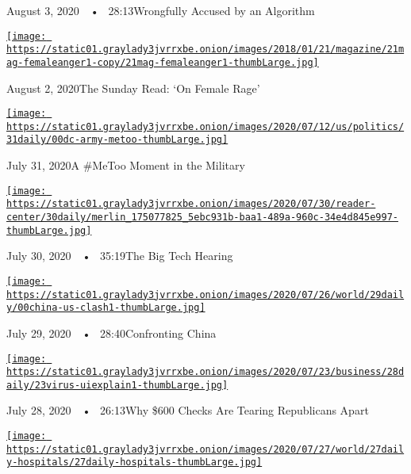 August 3, 2020~~•~ 28:13Wrongfully Accused by an Algorithm

\href{https://www.nytimes3xbfgragh.onion/2020/08/02/podcasts/the-daily/on-female-rage.html?action=click\&module=audio-series-bar\&region=header\&pgtype=Article}{\texttt{[image: https://static01.graylady3jvrrxbe.onion/images/2018/01/21/magazine/21mag-femaleanger1-copy/21mag-femaleanger1-thumbLarge.jpg]}}

August 2, 2020The Sunday Read: `On Female Rage'

\href{https://www.nytimes3xbfgragh.onion/2020/07/31/podcasts/the-daily/vanessa-guillen-military-metoo.html?action=click\&module=audio-series-bar\&region=header\&pgtype=Article}{\texttt{[image: https://static01.graylady3jvrrxbe.onion/images/2020/07/12/us/politics/31daily/00dc-army-metoo-thumbLarge.jpg]}}

July 31, 2020A \#MeToo Moment in the Military

\href{https://www.nytimes3xbfgragh.onion/2020/07/30/podcasts/the-daily/congress-facebook-amazon-google-apple.html?action=click\&module=audio-series-bar\&region=header\&pgtype=Article}{\texttt{[image: https://static01.graylady3jvrrxbe.onion/images/2020/07/30/reader-center/30daily/merlin\_175077825\_5ebc931b-baa1-489a-960c-34e4d845e997-thumbLarge.jpg]}}

July 30, 2020~~•~ 35:19The Big Tech Hearing

\href{https://www.nytimes3xbfgragh.onion/2020/07/29/podcasts/the-daily/china-trump-foreign-policy.html?action=click\&module=audio-series-bar\&region=header\&pgtype=Article}{\texttt{[image: https://static01.graylady3jvrrxbe.onion/images/2020/07/26/world/29daily/00china-us-clash1-thumbLarge.jpg]}}

July 29, 2020~~•~ 28:40Confronting China

\href{https://www.nytimes3xbfgragh.onion/2020/07/28/podcasts/the-daily/unemployment-benefits-coronavirus.html?action=click\&module=audio-series-bar\&region=header\&pgtype=Article}{\texttt{[image: https://static01.graylady3jvrrxbe.onion/images/2020/07/23/business/28daily/23virus-uiexplain1-thumbLarge.jpg]}}

July 28, 2020~~•~ 26:13Why \$600 Checks Are Tearing Republicans Apart

\href{https://www.nytimes3xbfgragh.onion/2020/07/27/podcasts/the-daily/new-york-hospitals-covid.html?action=click\&module=audio-series-bar\&region=header\&pgtype=Article}{\texttt{[image: https://static01.graylady3jvrrxbe.onion/images/2020/07/27/world/27daily-hospitals/27daily-hospitals-thumbLarge.jpg]}}

